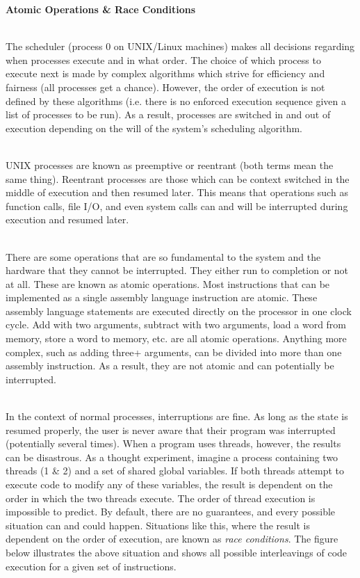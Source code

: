 \documentclass[12pt]{extarticle}
\newenvironment{myindentpar}[1]%
 {\begin{list}{}%
         {\setlength{\leftmargin}{#1}}%
         \item[]%
 }
 {\end{list}}
\begin{document}
\begin{myindentpar}{5mm}

    \noindent
    \textbf{Atomic Operations \& Race Conditions}
    
    \ \\
    The scheduler (process 0 on UNIX/Linux machines) makes all decisions regarding when processes execute and in what order.  The choice of which process to execute next is made by complex algorithms which strive for efficiency and fairness (all processes get a chance).  However, the order of execution is not defined by these algorithms (i.e. there is no enforced execution sequence given a list of processes to be run).  As a result, processes are switched in and out of execution depending on the will of the system's scheduling algorithm.  

    \ \\
    UNIX processes are known as preemptive or reentrant (both terms mean the same thing).  Reentrant processes are those which can be context switched in the middle of execution and then resumed later.  This means that operations such as function calls, file I/O, and even system calls can and will be interrupted during execution and resumed later.  
    
    \ \\
    There are some operations that are so fundamental to the system and the hardware that they cannot be interrupted.  They either run to completion or not at all.  These are known as atomic operations.  Most instructions that can be implemented as a single assembly language instruction are atomic.  These assembly language statements are executed directly on the processor in one clock cycle.  Add with two arguments, subtract with two arguments, load a word from memory, store a word to memory, etc. are all atomic operations.  Anything more complex, such as adding three+ arguments, can be divided into more than one assembly instruction.  As a result, they are not atomic and can potentially be interrupted.  
    
    \ \\
    In the context of normal processes, interruptions are fine.  As long as the state is resumed properly, the user is never aware that their program was interrupted (potentially several times).  When a program uses threads, however, the results can be disastrous.  As a thought experiment, imagine a process containing two threads (1 \& 2) and a set of shared global variables.  If both threads attempt to execute code to modify any of these variables, the result is dependent on the order in which the two threads execute.  The order of thread execution is impossible to predict.  By default, there are no guarantees, and every possible situation can and could happen.  Situations like this, where the result is dependent on the order of execution, are known as \emph{race conditions}.  The figure below illustrates the above situation and shows all possible interleavings of code execution for a given set of instructions.  
    

\end{myindentpar}
\end{document}
